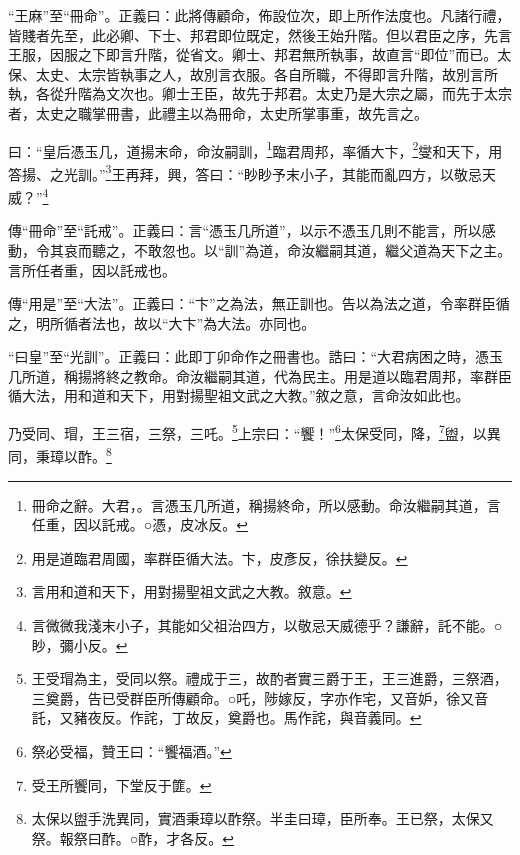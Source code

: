 {\noindent\shu{}\fzkt “王麻”至“冊命”。正義曰：此將傳顧命，佈設位次，即上所作法度也。凡諸行禮，皆賤者先至，此必卿、下士、邦君即位既定，然後王始升階。但以君臣之序，先言王服，因服之下即言升階，從省文。卿士、邦君無所執事，故直言“即位”而已。太保、太史、太宗皆執事之人，故別言衣服。各自所職，不得即言升階，故別言所執，各從升階為文次也。卿士王臣，故先于邦君。太史乃是大宗之屬，而先于太宗者，太史之職掌冊書，此禮主以為冊命，太史所掌事重，故先言之。 \par}

曰：“皇后憑玉几，道揚末命，命汝嗣訓，\footnote{冊命之辭。大君，。言憑玉几所道，稱揚終命，所以感動。命汝繼嗣其道，言任重，因以託戒。○憑，皮冰反。}臨君周邦，率循大卞，\footnote{用是道臨君周國，率群臣循大法。卞，皮彥反，徐扶變反。}燮和天下，用答揚、之光訓。”\footnote{言用和道和天下，用對揚聖祖文武之大教。敘意。}王再拜，興，答曰：“眇眇予末小子，其能而亂四方，以敬忌天威？”\footnote{言微微我淺末小子，其能如父祖治四方，以敬忌天威德乎？謙辭，託不能。○眇，彌小反。}


{\noindent\zhuan{}\fzbyks 傳“冊命”至“託戒”。正義曰：言“憑玉几所道”，以示不憑玉几則不能言，所以感動，令其哀而聽之，不敢忽也。以“訓”為道，命汝繼嗣其道，繼父道為天下之主。言所任者重，因以託戒也。 \par}

{\noindent\zhuan{}\fzbyks 傳“用是”至“大法”。正義曰：“卞”之為法，無正訓也。告以為法之道，令率群臣循之，明所循者法也，故以“大卞”為大法。亦同也。 \par}

{\noindent\shu{}\fzkt “曰皇”至“光訓”。正義曰：此即丁卯命作之冊書也。誥曰：“大君病困之時，憑玉几所道，稱揚將終之教命。命汝繼嗣其道，代為民主。用是道以臨君周邦，率群臣循大法，用和道和天下，用對揚聖祖文武之大教。”敘之意，言命汝如此也。 \par}

乃受同、瑁，王三宿，三祭，三吒。\footnote{王受瑁為主，受同以祭。禮成于三，故酌者實三爵于王，王三進爵，三祭酒，三奠爵，告已受群臣所傳顧命。○吒，陟嫁反，字亦作宅，又音妒，徐又音託，又豬夜反。作詫，丁故反，奠爵也。馬作詫，與音義同。}上宗曰：“饗！”\footnote{祭必受福，贊王曰：“饗福酒。”}太保受同，降，\footnote{受王所饗同，下堂反于篚。}盥，以異同，秉璋以酢。\footnote{太保以盥手洗異同，實酒秉璋以酢祭。半圭曰璋，臣所奉。王已祭，太保又祭。報祭曰酢。○酢，才各反。}


